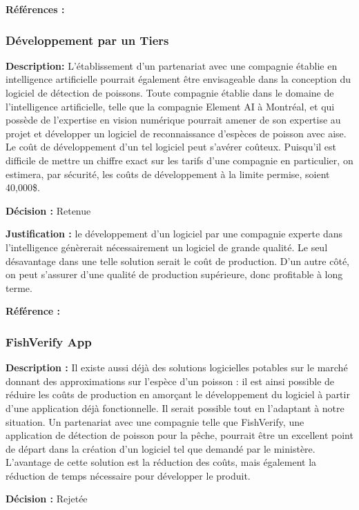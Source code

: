 \textbf{Références :}


\subsubsection{Développement par un Tiers}

\textbf{Description: }L’établissement d’un partenariat avec une compagnie établie en intelligence artificielle pourrait également être envisageable dans la conception du logiciel de détection de poissons. Toute compagnie établie dans le domaine de l’intelligence artificielle, telle que la compagnie Element AI à Montréal, et qui possède de l’expertise en vision numérique pourrait amener de son expertise au projet et développer un logiciel de reconnaissance d’espèces de poisson avec aise. Le coût de développement d’un tel logiciel peut s’avérer coûteux. Puisqu’il est difficile de mettre un chiffre exact sur les tarifs d’une compagnie en particulier, on estimera, par sécurité, les coûts de développement à la limite permise, soient 40,000\$.

\textbf{Décision :} Retenue

\textbf{Justification :} le développement d’un logiciel par une compagnie experte dans l’intelligence génèrerait nécessairement un logiciel de grande qualité. Le seul désavantage dans une telle solution serait le coût de production. D’un autre côté, on peut s’assurer d’une qualité de production supérieure, donc profitable à long terme.

\textbf{Référence :}


\subsubsection{FishVerify App}

\textbf{Description :} Il existe aussi déjà des solutions logicielles potables sur le marché donnant des approximations sur l’espèce d’un poisson : il est ainsi possible de réduire les coûts de production en amorçant le développement du logiciel à partir d’une application déjà fonctionnelle. Il serait possible tout en l’adaptant à notre situation. Un partenariat avec une compagnie telle que FishVerify, une application de détection de poisson pour la pêche, pourrait être un excellent point de départ dans la création d’un logiciel tel que demandé par le ministère. L’avantage de cette solution est la réduction des coûts, mais également la réduction de temps nécessaire pour développer le produit.

\textbf{Décision :} Rejetée

